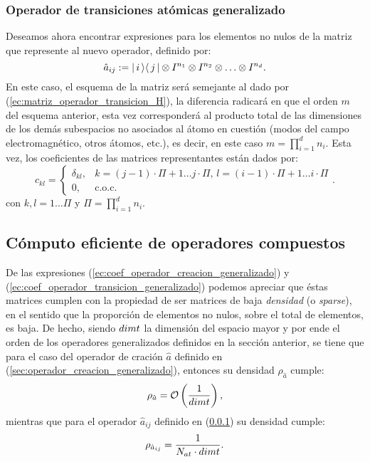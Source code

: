 \subsubsection{Operador de transiciones at\'omicas generalizado}\label{sec:operador_transiciones_generalizado} \quad Deseamos ahora encontrar expresiones para los elementos no nulos de la matriz que represente al nuevo operador, definido por:\begin{equation}\label{ec:operador_transiciones_generalizado}
 \hat{a}_{ij}:=\vert\, i \,\rangle\langle\, j \,\vert \otimes I^{n_1}\otimes I^{n_2} \otimes \ldots \otimes I^{n_d}.
\end{equation}
\quad En este caso, el esquema de la matriz ser\'a semejante al dado por (\ref{ec:matriz_operador_transicion_H}), la diferencia radicar\'a en que el orden $m$ del esquema anterior, esta vez corresponder\'a al producto total de las dimensiones de los dem\'as subespacios no asociados al \'atomo en cuesti\'on (modos del campo electromagn\'etico, otros \'atomos, etc.), es decir, en este caso $m=\prod_{i=1}^{d}n_i$. Esta vez, los coeficientes de las matrices representantes est\'an dados por:\begin{equation}\label{ec:coef_operador_transicion_generalizado}
 c_{kl}=\left\{\begin{array}{ll}
\delta_{kl}, & k=(j-1)\cdot \Pi+1\ldots j\cdot \Pi,\,l=(i-1)\cdot \Pi+1\ldots i\cdot \Pi \\
0, & \mbox{c.o.c.}
\end{array}\right..
\end{equation}
con $k,l=1\ldots \Pi$ y $\Pi=\prod_{i=1}^dn_i$.
\subsection{C\'omputo eficiente de operadores compuestos}\label{sec:computo_eficiente_operadores}
\quad De las expresiones (\ref{ec:coef_operador_creacion_generalizado}) y (\ref{ec:coef_operador_transicion_generalizado}) podemos apreciar que \'estas matrices cumplen con la propiedad de ser matrices de baja \emph{densidad} (o \emph{sparse}), en el sentido que la proporci\'on de elementos no nulos, sobre el total de elementos, es baja. De hecho, siendo $dimt$ la dimensi\'on del espacio mayor y por ende el orden de los operadores generalizados definidos en la secci\'on anterior, se tiene que para el caso del operador de craci\'on $\hat{a}$ definido en (\ref{sec:operador_creacion_generalizado}), entonces su densidad $\rho_{\hat{a}}$ cumple:
$$\rho_{\hat{a}}=\mathcal{O}\left(\frac{1}{dimt}\right),$$
mientras que para el operador $\hat{a}_{ij}$ definido en (\ref{sec:operador_transiciones_generalizado}) su densidad cumple:
$$\rho_{\hat{a}_{ij}}=\frac{1}{N_{at}\cdot dimt}.$$


